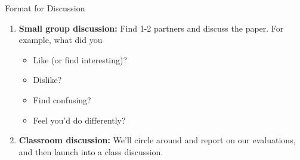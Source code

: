 \documentclass[10pt]{beamer}
\begin{document}
\begin{frame}{Format for Discussion}

\begin{enumerate}
	\item \textbf{Small group discussion:} Find 1-2 partners and discuss the paper.  For example, what did you
	\begin{itemize}
		\item Like (or find interesting)?
		\item Dislike?
		\item Find confusing?
		\item Feel you'd do differently?
	\end{itemize}
	\item \textbf{Classroom discussion:} We'll circle around and report on our evaluations, and then launch into a class discussion.
\end{enumerate}
	
\end{frame}
\end{document}
